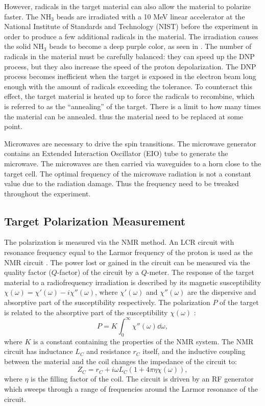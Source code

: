 However, radicals in the target material can also allow the material to polarize faster. The NH${}_3$ beads are irradiated with a 10 MeV linear accelerator at the National Institute of Standards and Technology (NIST) before the experiment in order to produce a few additional radicals in the material. The irradiation causes the solid NH${}_3$ beads to become a deep purple color, as seen in . The number of radicals in the material must be carefully balanced: they can speed up the DNP process, but they also increase the speed of the proton depolarization. The DNP process becomes inefficient when the target is exposed in the electron beam long enough with the amount of radicals exceeding the tolerance. To counteract this effect, the target material is heated up to force the radicals to recombine, which is referred to as the ``annealing'' of the target. There is a limit to how many times the material can be annealed. thus the material need to be replaced at some point.

Microwaves are necessary to drive the spin transitions. The microwave generator contains an Extended Interaction Oscillator (EIO) tube to generate the microwave. The microwaves are then carried via waveguides to a horn close to the target cell. The optimal frequency of the microwave radiation is not a constant value due to the radiation damage. Thus the frequency need to be tweaked throughout the experiment.

\subsection{Target Polarization Measurement}
\label{C5S3SS3}

The polarization is measured via the NMR method. An LCR circuit with resonance frequency equal to the Larmor frequency of the proton is used as the NMR circuit \cite{Crabb1997}. The power lost or gained in the circuit can be measured via the quality factor ($Q$-factor) of the circuit by a $Q$-meter. The response of the target material to a radiofrequency irradiation is described by its magnetic susceptibility $\chi(\omega)=\chi'(\omega)-i\chi''(\omega)$, where $\chi'(\omega)$ and $\chi''(\omega)$ are the dispersive and absorptive part of the susceptibility respectively. The polarization $P$ of the target is related to the absorptive part of the susceptibility $\chi(\omega)$ \cite{Goldman1975}:
\begin{equation} \label{C5S3SS3E1}
P = K\int_0^\infty\chi''(\omega)\dd{\omega},
\end{equation}
where $K$ is a constant containing the properties of the NMR system. The NMR circuit has inductance $L_C$ and resistance $r_C$ itself, and the inductive coupling between the material and the coil changes the impedance of the circuit to:
\begin{equation} \label{C5S3SS3E2}
Z_C = r_C+i\omega L_C(1+4\pi\eta\chi(\omega)),
\end{equation}
where $\eta$ is the filling factor of the coil. The circuit is driven by an RF generator which sweeps through a range of frequencies around the Larmor resonance of the circuit.


